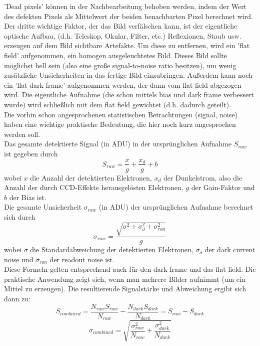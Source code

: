 'Dead pixels' können in der Nachbearbeitung behoben werden, indem der Wert des defekten Pixels als Mittelwert der beiden benachbarten Pixel berechnet wird.
\\
Der dritte wichtige Faktor, der das Bild verfälschen kann, ist der eigentliche optische Aufbau, (d.h. Teleskop, Okular, Filter, etc.) Reflexionen, Staub usw. erzeugen auf dem Bild sichtbare Artefakte. Um diese zu entfernen, wird ein 'flat field' aufgenommen, ein homogen ausgeleuchtetes Bild. Dieses Bild sollte möglichst hell sein (also eine große signal-to-noise ratio besitzen), um wenig zusätzliche Unsicherheiten in das fertige Bild einzubringen. Außerdem kann noch ein 'flat dark frame' aufgenommen werden, der dann vom flat field abgezogen wird. Die eigentliche Aufnahme (die schon mittels bias und dark frame verbessert wurde) wird schließlich mit dem flat field gewichtet (d.h. dadurch geteilt).
\\
Die vorhin schon angesprochenen statistischen Betrachtungen (signal, noise) haben eine wichtige praktische Bedeutung, die hier noch kurz angesprochen werden soll.
\\
Das gesamte detektierte Signal (in ADU) in der ursprünglichen Aufnahme $S_{raw}$ ist gegeben durch
\begin{equation}
S_{raw} = \frac{x}{g} + \frac{x_d}{g} + b
\end{equation}
wobei $x$ die Anzahl der detektierten Elektronen, $x_d$ der Dunkelstrom, also die Anzahl der durch CCD-Effekte herausgelösten Elektronen, $g$ der Gain-Faktor und $b$ der Bias ist.
\\
Die gesamte Unsicherheit $\sigma_{raw}$ (in ADU) der ursprünglichen Aufnahme berechnet sich durch 
\begin{equation}
\sigma_{raw} = \frac{\sqrt{\sigma^2 + \sigma_d^2 + \sigma_{ron}^2}}{g}
\end{equation}
wobei $\sigma$ die Standardabweichung der detektierten Elektronen, $\sigma_d$ der dark current noise und $\sigma_{ron}$ der readout noise ist.
\\
Diese Formeln gelten entsprechend auch für den dark frame und das flat field.
Die praktische Anwendung zeigt sich, wenn man mehrere Bilder aufnimmt (um ein Mittel zu erzeugen). Die resultierende Signalstärke und Abweichung ergibt sich dann zu:
\begin{equation}
S_{combined} = \frac{N_{raw}S_{raw}}{N_{raw}} - \frac{N_{dark}S_{dark}}{N_{dark}} = S_{raw} - S_{dark}
\end{equation}
\begin{equation}
\sigma_{combined} = \sqrt{\frac{\sigma_{raw}^2}{N_{raw}} + \frac{\sigma_{dark}^2}{N_{dark}}}
\end{equation}
